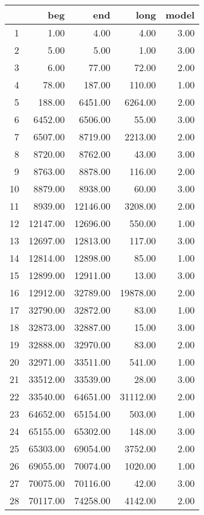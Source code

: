 \begingroup\tiny
\begin{tabular}{rrrrr}
  \hline
 & beg & end & long & model \\ 
  \hline
1 & 1.00 & 4.00 & 4.00 & 3.00 \\ 
  2 & 5.00 & 5.00 & 1.00 & 3.00 \\ 
  3 & 6.00 & 77.00 & 72.00 & 2.00 \\ 
  4 & 78.00 & 187.00 & 110.00 & 1.00 \\ 
  5 & 188.00 & 6451.00 & 6264.00 & 2.00 \\ 
  6 & 6452.00 & 6506.00 & 55.00 & 3.00 \\ 
  7 & 6507.00 & 8719.00 & 2213.00 & 2.00 \\ 
  8 & 8720.00 & 8762.00 & 43.00 & 3.00 \\ 
  9 & 8763.00 & 8878.00 & 116.00 & 2.00 \\ 
  10 & 8879.00 & 8938.00 & 60.00 & 3.00 \\ 
  11 & 8939.00 & 12146.00 & 3208.00 & 2.00 \\ 
  12 & 12147.00 & 12696.00 & 550.00 & 1.00 \\ 
  13 & 12697.00 & 12813.00 & 117.00 & 3.00 \\ 
  14 & 12814.00 & 12898.00 & 85.00 & 1.00 \\ 
  15 & 12899.00 & 12911.00 & 13.00 & 3.00 \\ 
  16 & 12912.00 & 32789.00 & 19878.00 & 2.00 \\ 
  17 & 32790.00 & 32872.00 & 83.00 & 1.00 \\ 
  18 & 32873.00 & 32887.00 & 15.00 & 3.00 \\ 
  19 & 32888.00 & 32970.00 & 83.00 & 2.00 \\ 
  20 & 32971.00 & 33511.00 & 541.00 & 1.00 \\ 
  21 & 33512.00 & 33539.00 & 28.00 & 3.00 \\ 
  22 & 33540.00 & 64651.00 & 31112.00 & 2.00 \\ 
  23 & 64652.00 & 65154.00 & 503.00 & 1.00 \\ 
  24 & 65155.00 & 65302.00 & 148.00 & 3.00 \\ 
  25 & 65303.00 & 69054.00 & 3752.00 & 2.00 \\ 
  26 & 69055.00 & 70074.00 & 1020.00 & 1.00 \\ 
  27 & 70075.00 & 70116.00 & 42.00 & 3.00 \\ 
  28 & 70117.00 & 74258.00 & 4142.00 & 2.00 \\ 

\end{tabular}
